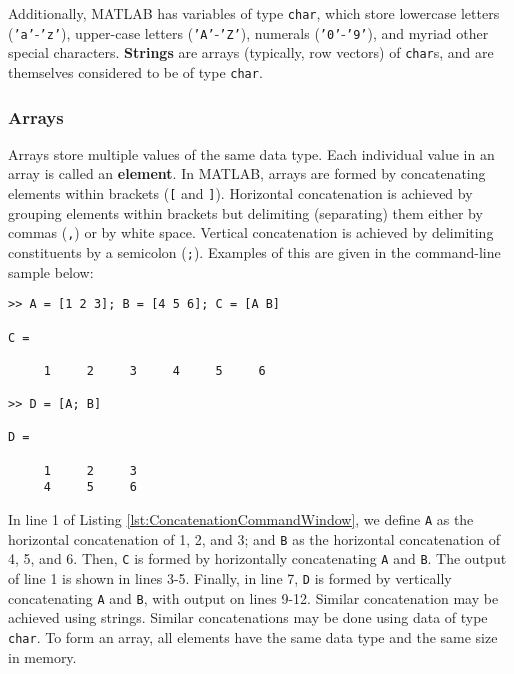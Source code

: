Additionally, MATLAB has variables of type \texttt{char}, which store lowercase letters (\texttt{'a'}-\texttt{'z'}), upper-case letters (\texttt{'A'}-\texttt{'Z'}), numerals (\texttt{'0'}-\texttt{'9'}), and myriad other special characters. \textbf{Strings} are arrays (typically, row vectors) of \texttt{char}s, and are themselves considered to be of type \texttt{char}.

\subsubsection{Arrays}

Arrays store multiple values of the same data type. Each individual value in an array is called an \textbf{element}. In MATLAB, arrays are formed by concatenating elements within brackets (\texttt{[} and \texttt{]}). Horizontal concatenation is achieved by grouping elements within brackets but delimiting (separating) them either by commas (\texttt{,}) or by white space. Vertical concatenation is achieved by delimiting constituents by a semicolon (\texttt{;}). Examples of this are given in the command-line sample below:
\begin{lstlisting}[style=Matlab-editor, caption={The Command Window input and output demonstrates horizontal concatenation and vertical concatenation. Concatenation is accomplished using brackets \texttt{[} and \texttt{]}. Elements of a horizontal concatenation are separated by whites space or commas (\texttt{,}); and elements of a vertical concatenation are specified using a semicolon (\texttt{;}).}, label={lst:ConcatenationCommandWindow}]
 >> A = [1 2 3]; B = [4 5 6]; C = [A B]

C =

     1     2     3     4     5     6

>> D = [A; B]

D =

     1     2     3
     4     5     6
\end{lstlisting}
In line 1 of Listing \ref{lst:ConcatenationCommandWindow}, we define \texttt{A} as the horizontal concatenation of 1, 2, and 3; and \texttt{B} as the horizontal concatenation of 4, 5, and 6. Then, \texttt{C} is formed by horizontally concatenating \texttt{A} and \texttt{B}. The output of line 1 is shown in lines 3-5. Finally, in line 7, \texttt{D} is formed by vertically concatenating \texttt{A} and \texttt{B}, with output on lines 9-12. Similar concatenation may be achieved using strings. Similar concatenations may be done using data of type \texttt{char}. To form an array, all elements have the same data type and the same size in memory.

